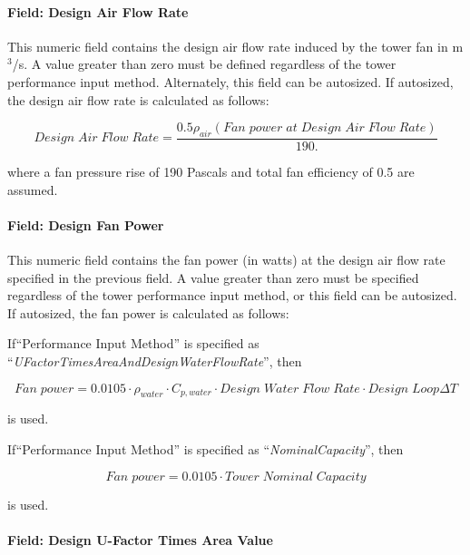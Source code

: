 \paragraph{Field: Design Air Flow Rate}\label{field-design-air-flow-rate}

This numeric field contains the design air flow rate induced by the tower fan in m\(^{3}\)/s. A value greater than zero must be defined regardless of the tower performance input method. Alternately, this field can be autosized. If autosized, the design air flow rate is calculated as follows:

\begin{equation}
Design\;Air\;Flow\;Rate = \frac{{0.5{\rho_{air}}(Fan\;power\;at\;Design\;Air\;Flow\;Rate)}}{{190.}}
\end{equation}

where a fan pressure rise of 190 Pascals and total fan efficiency of 0.5 are assumed.

\paragraph{Field: Design Fan Power}

This numeric field contains the fan power (in watts) at the design air flow rate specified in the previous field. A value greater than zero must be specified regardless of the tower performance input method, or this field can be autosized. If autosized, the fan power is calculated as follows:

If``Performance Input Method'' is specified as ``\emph{UFactorTimesAreaAndDesignWaterFlowRate}'', then

\begin{equation}
Fan\;power = 0.0105\cdot {\rho_{water}}\cdot {C_{p,water}}\cdot Design\;Water\;Flow\;Rate\cdot Design\;Loop\Delta T
\end{equation}

is used.

If``Performance Input Method'' is specified as ``\emph{NominalCapacity}'', then

\begin{equation}
Fan\;power = 0.0105\cdot Tower\;Nominal\;Capacity
\end{equation}

is used.

\paragraph{Field: Design U-Factor Times Area Value}\label{field-design-u-factor-times-area-value}

